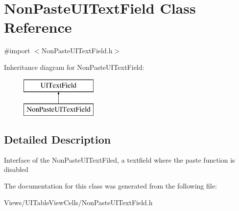 \hypertarget{interface_non_paste_u_i_text_field}{}\section{Non\+Paste\+U\+I\+Text\+Field Class Reference}
\label{interface_non_paste_u_i_text_field}


{\ttfamily \#import $<$Non\+Paste\+U\+I\+Text\+Field.\+h$>$}

Inheritance diagram for Non\+Paste\+U\+I\+Text\+Field\+:\begin{figure}[H]
\begin{center}
\leavevmode
\includegraphics[height=2.000000cm]{interface_non_paste_u_i_text_field}
\end{center}
\end{figure}


\subsection{Detailed Description}
Interface of the Non\+Paste\+U\+I\+Text\+Filed, a textfield where the paste function is disabled 

The documentation for this class was generated from the following file\+:\begin{DoxyCompactItemize}
\item 
Views/\+U\+I\+Table\+View\+Cells/Non\+Paste\+U\+I\+Text\+Field.\+h\end{DoxyCompactItemize}
